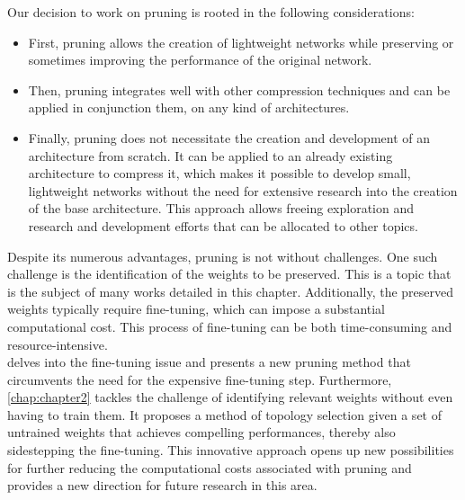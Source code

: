 \noindent Our decision to work on pruning is rooted in the following
considerations:
\begin{itemize}
  \item First, pruning allows the creation of lightweight networks while
  preserving or sometimes improving the performance of the original network.

  

  \item Then, pruning integrates well with other compression techniques and can
  be applied in conjunction them, on any kind of architectures.

  \item  Finally, pruning does not necessitate the creation and development of
  an architecture from scratch. It can be applied to an already existing
  architecture to compress it, which makes it possible to develop small,
  lightweight networks without the need for extensive research into the creation
  of the base architecture. This approach allows freeing exploration and
  research and development efforts that can be allocated to other topics.

\end{itemize}

Despite its numerous advantages, pruning is not without challenges. One such
challenge is the identification of the weights to be preserved. This is a topic
that is the subject of many works detailed in this chapter. Additionally, the
preserved weights typically require fine-tuning, which can impose a substantial
computational cost. This process of fine-tuning can be both time-consuming and
resource-intensive.\\

 delves into the fine-tuning issue and presents a new
pruning method that circumvents the need for the expensive fine-tuning step.
Furthermore, \cref{chap:chapter2} tackles the challenge of identifying relevant
weights without even having to train them. It proposes a method of topology
selection given a set of untrained weights that achieves compelling
performances, thereby also sidestepping the fine-tuning. This innovative
approach opens up new possibilities for further reducing the computational costs
associated with pruning and provides a new direction for future research in this
area.\\



